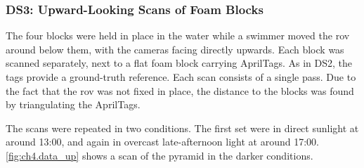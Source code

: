 \subsubsection{DS3: Upward-Looking Scans of Foam Blocks}
\label{sec:ch4.ds3}
The four blocks were held in place in the water while a swimmer
moved the \gls{rov} around below them, with the cameras facing directly upwards.
Each block was scanned separately, next to a flat foam block carrying AprilTags. As in DS2, the tags
provide a ground-truth reference. Each scan consists of a single pass. Due to the fact that the \gls{rov} was not fixed
in place, the distance to the blocks was found by triangulating the AprilTags.

The scans were repeated in two conditions. The first set were in direct sunlight at around 13:00, and again in overcast
late-afternoon light at around 17:00. \autoref{fig:ch4.data_up} shows a scan of the pyramid in the
darker conditions.
